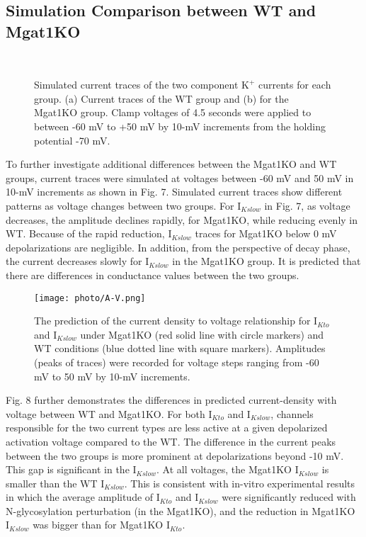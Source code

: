 \documentclass[journal]{IEEEtran}
\begin{document}
\subsection{Simulation Comparison between WT and Mgat1KO}
\begin{figure}
    \label{fig 7}
    \centering
    \\
    \caption{Simulated current traces of the two component $\text{K}^{+}$ currents for each group. (a) Current traces of the WT group and (b) for the Mgat1KO group. Clamp voltages of 4.5 seconds were applied to between -60 mV to +50 mV by 10-mV increments from the holding potential -70 mV.}
\end{figure}
To further investigate additional differences between the Mgat1KO and WT groups, current traces were simulated at voltages between -60 mV and 50 mV in 10-mV increments as shown in Fig. 7. Simulated current traces show different patterns as voltage changes between two groups. For $\text{I}_{Kslow}$ in Fig. 7, as voltage decreases, the amplitude declines rapidly, for Mgat1KO, while reducing evenly in WT. Because of the rapid reduction, $\text{I}_{Kslow}$ traces for Mgat1KO below 0 mV depolarizations are negligible. In addition, from the perspective of decay phase, the current decreases slowly for $\text{I}_{Kslow}$ in the Mgat1KO group. It is predicted that there are differences in conductance values between the two groups.

\begin{figure}
    \label{fig 8}
    \centering
    \texttt{[image: photo/A-V.png]}
    \caption{The prediction of the current density to voltage relationship for $\text{I}_{Kto}$ and $\text{I}_{Kslow}$ under Mgat1KO (red solid line with circle markers) and WT conditions (blue dotted line with square markers). Amplitudes (peaks of traces) were recorded for voltage steps ranging from -60 mV to 50 mV by 10-mV increments.} 
\end{figure}
Fig. 8 further demonstrates the differences in predicted current-density with voltage between WT and Mgat1KO. For both $\text{I}_{Kto}$ and $\text{I}_{Kslow}$, channels responsible for the two current types are less  active at a given depolarized activation voltage compared to the WT. The difference in the current peaks between the two groups is more prominent at depolarizations beyond -10 mV. This gap is significant in the $\text{I}_{Kslow}$. At all voltages, the Mgat1KO $\text{I}_{Kslow}$ is smaller than the WT $\text{I}_{Kslow}$. This is consistent with in-vitro experimental results in which the average amplitude of $\text{I}_{Kto}$ and $\text{I}_{Kslow}$ were significantly reduced with N-glycosylation perturbation (in the Mgat1KO), and the reduction in Mgat1KO $\text{I}_{Kslow}$ was bigger than for Mgat1KO $\text{I}_{Kto}$. 
\end{document}
